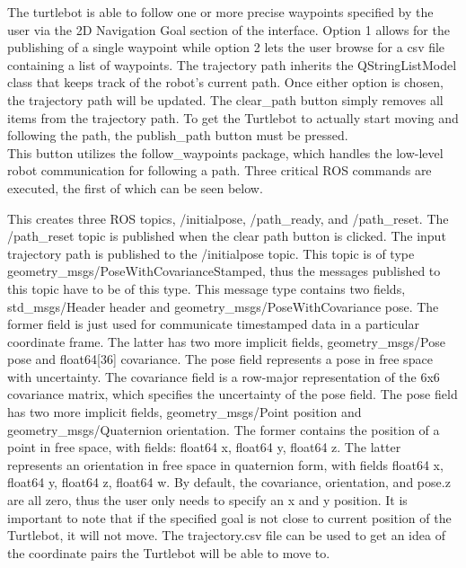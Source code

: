 \documentclass[12]{article}
\begin{document}
The turtlebot is able to follow one or more precise waypoints specified by the user via the 2D Navigation Goal section of the interface. 
Option 1 allows for the publishing of a single waypoint while option 2 lets the user browse for a csv file containing a list of waypoints. 
The trajectory path inherits the QStringListModel class that keeps track of the robot's current path. 
Once either option is chosen, the trajectory path will be updated. 
The clear\_path button simply removes all items from the trajectory path. 
To get the Turtlebot to actually start moving and following the path, the publish\_path button must be pressed.\\ 

This button utilizes the follow\_waypoints package, which handles the low-level robot communication for following a path. 
Three critical ROS commands are executed, the first of which can be seen below.



This creates three ROS topics, /initialpose, /path\_ready, and /path\_reset. 
The /path\_reset topic is published when the clear path button is clicked. 
The input trajectory path is published to the /initialpose topic. 
This topic is of type geometry\_msgs/PoseWithCovarianceStamped, 
thus the messages published to this topic have to be of this type. 
This message type contains two fields, std\_msgs/Header header and geometry\_msgs/PoseWithCovariance pose. 
The former field is just used for communicate timestamped data in a particular coordinate frame. 
The latter has two more implicit fields, geometry\_msgs/Pose pose and float64[36] covariance. 
The pose field represents a pose in free space with uncertainty. 
The covariance field is a row-major representation of the 6x6 covariance matrix, which specifies the uncertainty of the pose field. 
The pose field has two more implicit fields, geometry\_msgs/Point position and geometry\_msgs/Quaternion orientation. 
The former contains the position of a point in free space, with fields: float64 x, float64 y, float64 z. 
The latter represents an orientation in free space in quaternion form, with fields float64 x, float64 y, float64 z, float64 w. 
By default, the covariance, orientation, and pose.z are all zero, thus the user only needs to specify an x and y position. 
It is important to note that if the specified goal is not close to current position of the Turtlebot, it will not move. 
The trajectory.csv file can be used to get an idea of the coordinate pairs the Turtlebot will be able to move to.\\
\end{document}
